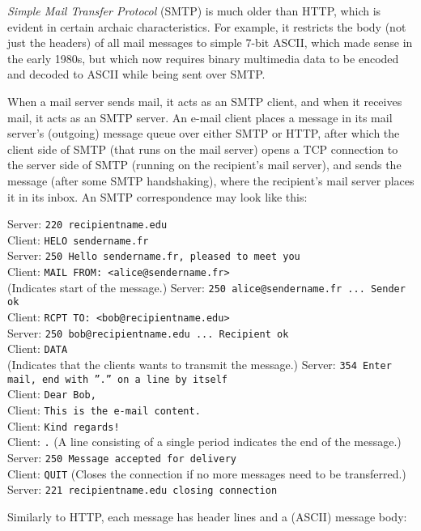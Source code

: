 \documentclass[8pt, table, xcdraw]{article}%
\begin{document}
\emph{Simple Mail Transfer Protocol} (SMTP) is much older than HTTP, which is evident in certain archaic characteristics. For example, it
restricts the body (not just the headers) of all mail messages to simple 7-bit ASCII, which made sense in the early 1980s, but which now requires
binary multimedia data to be encoded and decoded to ASCII while being sent over SMTP.

When a mail server sends mail, it acts as an SMTP client, and when it receives mail, it acts as an SMTP server. An e-mail client places a message in its mail server's (outgoing) message queue over either SMTP or HTTP, after which the client side of SMTP (that runs on the mail server) opens a TCP connection to the server side of SMTP (running on the recipient's mail server), and sends the message (after some SMTP handshaking), where the recipient's mail server places it in its inbox. An SMTP correspondence may look like this:

Server: \texttt{220 recipientname.edu}\\
Client: \texttt{HELO sendername.fr}\\
Server: \texttt{250 Hello sendername.fr, pleased to meet you}\\
Client: \texttt{MAIL FROM: <alice@sendername.fr>}\\ (Indicates start of the message.)
Server: \texttt{250 alice@sendername.fr ... Sender ok}\\
Client: \texttt{RCPT TO: <bob@recipientname.edu>}\\
Server: \texttt{250 bob@recipientname.edu ... Recipient ok}\\
Client: \texttt{DATA}\\ (Indicates that the clients wants to transmit the message.)
Server: \texttt{354 Enter mail, end with ”.” on a line by itself}\\
Client: \texttt{Dear Bob,}\\
Client: \texttt{This is the e-mail content.}\\
Client: \texttt{Kind regards!}\\
Client: \texttt{.} (A line consisting of a single period indicates the end of the message.)\\
Server: \texttt{250 Message accepted for delivery}\\
Client: \texttt{QUIT} (Closes the connection if no more messages need to be transferred.)\\
Server: \texttt{221 recipientname.edu closing connection}

Similarly to HTTP, each message has header lines and a (ASCII) message body:
\end{document}
